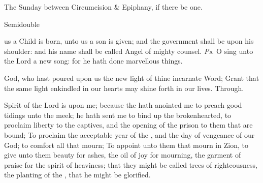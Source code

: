 \begin{inhead}
{The Sunday between Circumcision \& Epiphany, if there be one.}\par
{Semidouble}
\end{inhead}

\properantiphonfix

\introit
{} us a Child is born, unto us a son is given; and the government shall be upon his shoulder: and his name shall be called Angel of mighty counsel. \textit{Ps.} O sing unto the Lord a new song: for he hath done marvellous things.

\collect
{} God, who hast poured upon us the new light of thine incarnate Word; Grant that the same light enkindled in our hearts may shine forth in our lives. Through.

 Spirit of the Lord  is upon me; because the  hath anointed me to preach good tidings unto the meek; he hath sent me to bind up the brokenhearted, to proclaim liberty to the captives, and the opening of the prison to them that are bound; To proclaim the acceptable year of the , and the day of vengeance of our God; to comfort all that mourn; To appoint unto them that mourn in Zion, to give unto them beauty for ashes, the oil of joy for mourning, the garment of praise for the spirit of heaviness; that they might be called trees of righteousness, the planting of the , that he might be glorified.


